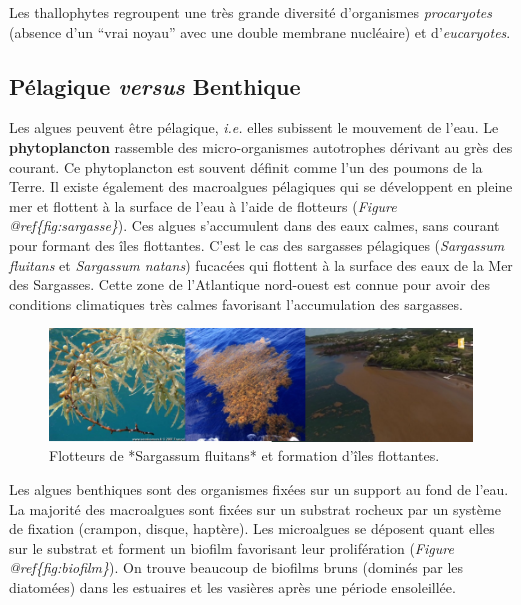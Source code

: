 \documentclass[
]{book}
\begin{document}
Les thallophytes regroupent une très grande diversité d'organismes \emph{procaryotes} (absence d'un ``vrai noyau'' avec une double membrane nucléaire) et d'\emph{eucaryotes}.

\hypertarget{puxe9lagique-versus-benthique}{%
\subsection{\texorpdfstring{Pélagique \emph{versus} Benthique}{Pélagique versus Benthique}}\label{puxe9lagique-versus-benthique}}

Les algues peuvent être pélagique, \emph{i.e.} elles subissent le mouvement de l'eau. Le \textbf{phytoplancton} rassemble des micro-organismes autotrophes dérivant au grès des courant. Ce phytoplancton est souvent définit comme l'un des poumons de la Terre. Il existe également des macroalgues pélagiques qui se développent en pleine mer et flottent à la surface de l'eau à l'aide de flotteurs (\emph{Figure @ref\{fig:sargasse\}}). Ces algues s'accumulent dans des eaux calmes, sans courant pour formant des îles flottantes. C'est le cas des sargasses pélagiques (\emph{Sargassum fluitans} et \emph{Sargassum natans}) fucacées qui flottent à la surface des eaux de la Mer des Sargasses. Cette zone de l'Atlantique nord-ouest est connue pour avoir des conditions climatiques très calmes favorisant l'accumulation des sargasses.

\begin{figure}

{\centering \includegraphics[width=13.28in]{images/sargasse} 

}

\caption{Flotteurs de *Sargassum fluitans* et formation d'îles flottantes.}\label{fig:sargasse}
\end{figure}

Les algues benthiques sont des organismes fixées sur un support au fond de l'eau. La majorité des macroalgues sont fixées sur un substrat rocheux par un système de fixation (crampon, disque, haptère). Les microalgues se déposent quant elles sur le substrat et forment un biofilm favorisant leur prolifération (\emph{Figure @ref\{fig:biofilm\}}). On trouve beaucoup de biofilms bruns (dominés par les diatomées) dans les estuaires et les vasières après une période ensoleillée.
\end{document}
